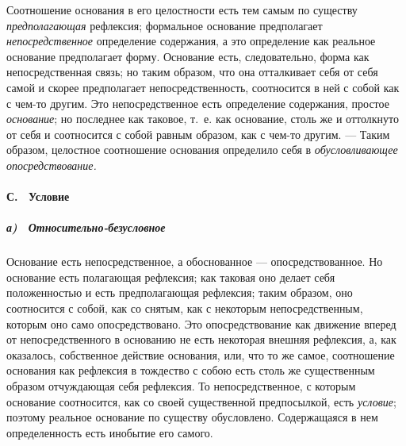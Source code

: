 Соотношение основания в его целостности есть тем самым по существу
{\em предполагающая} рефлексия; формальное основание
предполагает {\em непосредственное} определение
содержания, а это определение как реальное основание предполагает форму.
Основание есть, следовательно, форма как непосредственная связь; но таким
образом, что она отталкивает себя от себя самой и скорее предполагает
непосредственность, соотносится в ней с собой как с чем-то другим. Это
непосредственное есть определение содержания, простое
{\em основание}; но последнее как таковое, т.~е. как
основание, столь же и оттолкнуто от себя и соотносится с собой равным
образом, как с чем-то другим. — Таким образом, целостное соотношение
основания определило себя в {\em обусловливающее
опосредствование.}

\paragraph[С. \ Условие]{С. \ Условие}
\hypertarget{Toc478978731}{}\subparagraph[а)
\ Относительно{}-безусловное]{а) \ Относительно-безусловное}
\hypertarget{Toc478978732}{}Основание есть непосредственное, а обоснованное
— опосредствованное. Но основание есть полагающая рефлексия; как таковая
оно делает себя положенностью и есть предполагающая рефлексия; таким
образом, оно соотносится с собой, как со снятым, как с некоторым
непосредственным, которым оно само опосредствовано. Это опосредствование
как движение вперед от непосредственного в основанию не есть некоторая
внешняя рефлексия, а, как оказалось, собственное действие основания, или,
что то же самое, соотношение основания как рефлексия в тождество с собою
есть столь же существенным образом отчуждающая себя рефлексия. То
непосредственное, с которым основание соотносится, как со своей
существенной предпосылкой, есть {\em условие}; поэтому
реальное основание по существу обусловлено. Содержащаяся в нем
определенность есть инобытие его самого.

